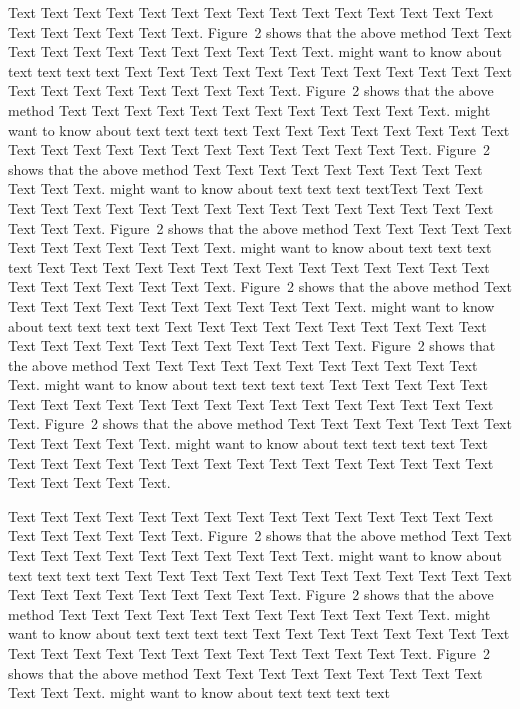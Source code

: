 \documentclass{bioinfo}
\begin{document}
\begin{methods}
	Text Text Text Text Text Text  Text Text Text Text Text Text Text
	Text Text  Text Text Text Text Text Text.
	Figure~2\vphantom{\ref{fig:02}} shows that the above method  Text
	Text Text Text  Text Text Text Text Text Text  Text Text.
	\citealp{Boffelli03} might want to know about  text text text text
	Text Text Text Text Text Text  Text Text Text Text Text Text Text
	Text Text  Text Text Text Text Text Text.
	Figure~2\vphantom{\ref{fig:02}} shows that the above method  Text
	Text Text Text  Text Text Text Text Text Text  Text Text.
	\citealp{Boffelli03} might want to know about  text text text text
	Text Text Text Text Text Text Text Text Text Text Text Text Text
	Text Text  Text Text Text Text Text Text.
	Figure~2\vphantom{\ref{fig:02}} shows that the above method  Text
	Text Text Text  Text Text Text Text Text Text  Text Text.
	\citealp{Boffelli03} might want to know about  text text text
	textText Text Text Text Text Text  Text Text Text Text Text Text
	Text Text Text  Text Text Text Text Text Text.
	Figure~2\vphantom{\ref{fig:02}} shows that the above method  Text
	Text Text Text  Text Text Text Text Text Text  Text Text.
	\citealp{Boffelli03} might want to know about  text text text text
	Text Text Text Text Text Text Text Text Text Text Text Text Text
	Text Text  Text Text Text Text Text Text.
	Figure~2\vphantom{\ref{fig:02}} shows that the above method  Text
	Text Text Text  Text Text Text Text Text Text  Text Text.
	\citealp{Boffelli03} might want to know about  text text text text
	Text Text Text Text Text Text  Text Text Text Text Text Text Text
	Text Text  Text Text Text Text Text Text.
	Figure~2\vphantom{\ref{fig:02}} shows that the above method  Text
	Text Text Text  Text Text Text Text Text Text  Text Text.
	\citealp{Boffelli03} might want to know about  text text text text
	Text Text Text Text Text Text Text Text Text Text Text Text Text
	Text Text  Text Text Text Text Text Text.
	Figure~2\vphantom{\ref{fig:02}} shows that the above method  Text
	Text Text Text  Text Text Text Text Text Text  Text Text.
	\citealp{Boffelli03} might want to know about  text text text text
	Text Text Text Text Text Text  Text Text Text Text Text Text Text
	Text Text  Text Text Text Text Text Text.

	\enlargethispage{6pt}


	Text Text Text Text Text Text  Text Text Text Text Text Text Text
	Text Text  Text Text Text Text Text Text.
	Figure~2\vphantom{\ref{fig:02}} shows that the above method  Text
	Text Text Text  Text Text Text Text Text Text  Text Text.
	\citealp{Boffelli03} might want to know about  text text text text
	Text Text Text Text Text Text  Text Text Text Text Text Text Text
	Text Text  Text Text Text Text Text Text.
	Figure~2\vphantom{\ref{fig:02}} shows that the above method  Text
	Text Text Text  Text Text Text Text Text Text  Text Text.
	\citealp{Boffelli03} might want to know about  text text text text
	Text Text Text Text Text Text Text Text Text Text Text Text Text
	Text Text  Text Text Text Text Text Text.
	Figure~2\vphantom{\ref{fig:02}} shows that the above method  Text
	Text Text Text  Text Text Text Text Text Text  Text Text.
	\citealp{Boffelli03} might want to know about  text text text text




\end{methods}
\end{document}
